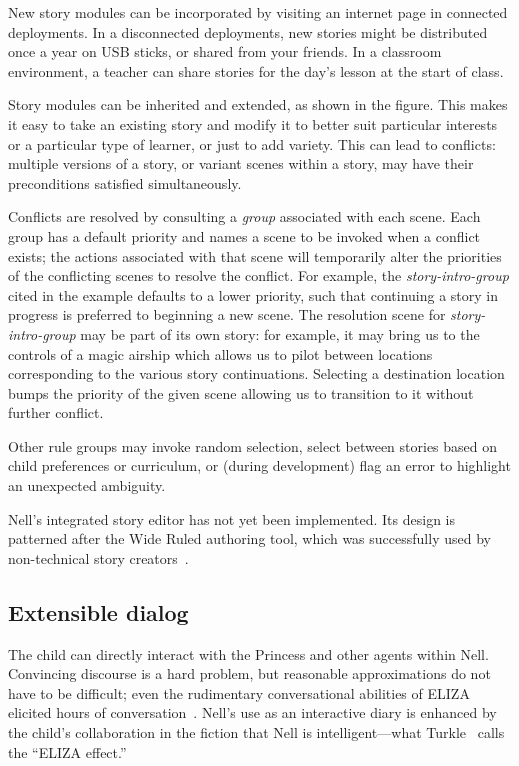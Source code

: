 \documentclass[preprint]{sig-alternate}
\begin{document}

New story modules can be incorporated by visiting an internet page in
connected deployments.  In a disconnected deployments, new stories
might be distributed once a year on USB sticks, or shared from your
friends.  In a classroom environment, a teacher can share stories for
the day's lesson at the start of class.

Story modules can be inherited and extended, as shown in the figure.
This makes it easy to take an existing story and modify it to
better suit particular interests or a particular type of learner, or
just to add variety.  This can lead to conflicts: multiple versions of
a story, or variant scenes within a story, may have their
preconditions satisfied simultaneously.

Conflicts are resolved by consulting a \textit{group} associated with
each scene.  Each group has a default priority and names a scene to be
invoked when a conflict exists; the actions associated with that scene
will temporarily alter the priorities of the conflicting scenes to
resolve the conflict.  For example, the \textit{story-intro-group}
cited in the example defaults to a lower priority, such that
continuing a story in progress is preferred to beginning a new scene.
The resolution scene for \textit{story-intro-group} may be part of its
own story: for example, it may bring us to the controls of a magic airship
which allows us to pilot between locations corresponding to the
various story continuations.  Selecting a destination location bumps
the priority of the given scene allowing us to transition to it
without further conflict.

Other rule groups may invoke random selection, select between stories
based on child preferences or curriculum, or (during development) flag
an error to highlight an unexpected ambiguity.

Nell's integrated story editor has not yet been implemented.  Its
design is patterned after the Wide Ruled authoring tool, which was
successfully used by non-technical story creators~\cite{skorupski:2009}.


\subsection{Extensible dialog}
The child can directly interact with the Princess and other agents within
Nell.  Convincing discourse is a hard problem, but
reasonable approximations do not have to be difficult; even
the rudimentary conversational abilities of ELIZA elicited hours of
conversation~\cite{weizenbaum:power}.
Nell's use as an interactive diary is enhanced by the child's
collaboration in the fiction that Nell is intelligent---what
Turkle~\cite{turkle:alone} calls the ``ELIZA effect.''
\end{document}
